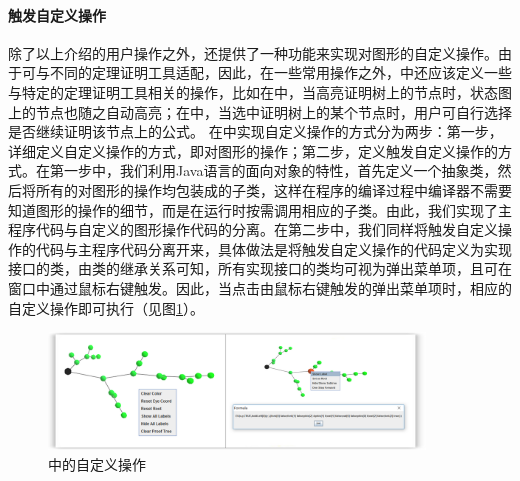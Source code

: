 \paragraph{触发自定义操作}
除了以上介绍的用户操作之外，还提供了一种功能来实现对图形的自定义操作。由于可与不同的定理证明工具适配，因此，在一些常用操作之外，中还应该定义一些与特定的定理证明工具相关的操作，比如在\sctlprov{}中，当高亮证明树上的节点时，状态图上的节点也随之自动高亮；在中，当选中证明树上的某个节点时，用户可自行选择是否继续证明该节点上的公式。
在中实现自定义操作的方式分为两步：第一步，详细定义自定义操作的方式，即对图形的操作；第二步，定义触发自定义操作的方式。在第一步中，我们利用Java语言的面向对象的特性，首先定义一个抽象类，然后将所有的对图形的操作均包装成的子类，这样在程序的编译过程中编译器不需要知道图形的操作的细节，而是在运行时按需调用相应的子类。由此，我们实现了主程序代码与自定义的图形操作代码的分离。在第二步中，我们同样将触发自定义操作的代码与主程序代码分离开来，具体做法是将触发自定义操作的代码定义为实现接口的类，由类的继承关系可知，所有实现接口的类均可视为弹出菜单项，且可在窗口中通过鼠标右键触发。因此，当点击由鼠标右键触发的弹出菜单项时，相应的自定义操作即可执行（见图\ref{vmdv:prooftree:userdefined}）。
\begin{figure}[h!]
	\centering
	\includegraphics[width=10cm]{Img/user_defined_operation}
	\caption{中的自定义操作}
	\label{vmdv:prooftree:userdefined}
\end{figure}
